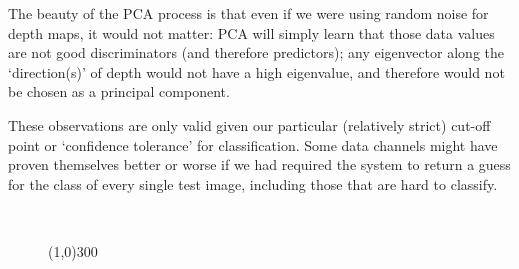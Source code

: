 The beauty of the PCA process is that even if we were using random noise for depth maps, it would not matter: PCA will simply learn that those data values are not good discriminators (and therefore predictors); any eigenvector along the `direction(s)' of depth would not have a high eigenvalue, and therefore would not be chosen as a principal component.

These observations are only valid given our particular (relatively strict) cut-off point or `confidence tolerance' for classification. Some data channels might have proven themselves better or worse if we had required the system to return a guess for the class of every single test image, including those that are hard to classify.

\begin{figure}[h]
 \centering

 \\

\begin{center}
\line(1,0){300}
\end{center}


\end{figure}
